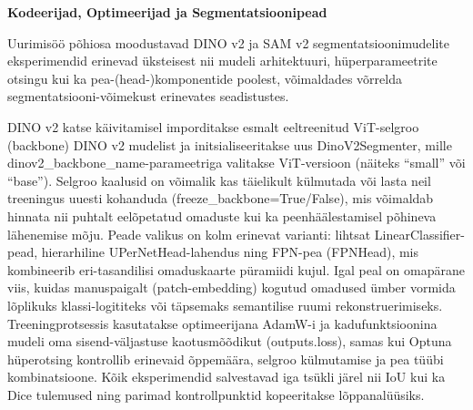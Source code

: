 \textbf{Kodeerijad, Optimeerijad ja Segmentatsioonipead}

Uurimisöö põhiosa moodustavad DINO v2 ja SAM v2 segmentatsioonimudelite eksperimendid erinevad üksteisest nii mudeli
arhitektuuri, hüperparameetrite otsingu kui ka pea-(head-)komponentide poolest,
võimaldades võrrelda segmentatsiooni-võimekust erinevates seadistustes.

DINO v2 katse käivitamisel imporditakse esmalt eeltreenitud ViT-selgroo (backbone)
DINO v2 mudelist ja initsialiseeritakse uus DinoV2Segmenter, mille
dinov2\_backbone\_name-parameetriga valitakse ViT-versioon (näiteks ``small''
või ``base''). Selgroo kaalusid on võimalik kas täielikult külmutada või
lasta neil treeningus uuesti kohanduda (freeze\_backbone=True/False), mis
võimaldab hinnata nii puhtalt eelõpetatud omaduste kui ka peenhäälestamisel põhineva lähenemise
mõju. Peade valikus on kolm erinevat varianti: lihtsat LinearClassifier-pead,
hierarhiline UPerNetHead-lahendus ning FPN-pea (FPNHead), mis kombineerib
eri-tasandilisi omaduskaarte püramiidi kujul. Igal peal on omapärane viis,
kuidas manuspaigalt (patch-embedding) kogutud omadused ümber vormida lõplikuks
klassi-logititeks või täpsemaks semantilise ruumi rekonstruerimiseks.
Treeningprotsessis kasutatakse optimeerijana AdamW-i ja kadufunktsioonina mudeli
oma sisend-väljastuse kaotusmõõdikut (outputs.loss), samas kui Optuna
hüperotsing kontrollib erinevaid õppemäära, selgroo külmutamise ja pea tüübi
kombinatsioone. Kõik eksperimendid salvestavad iga tsükli järel nii IoU kui ka
Dice tulemused ning parimad kontrollpunktid kopeeritakse lõppanalüüsiks.
\bigskip

